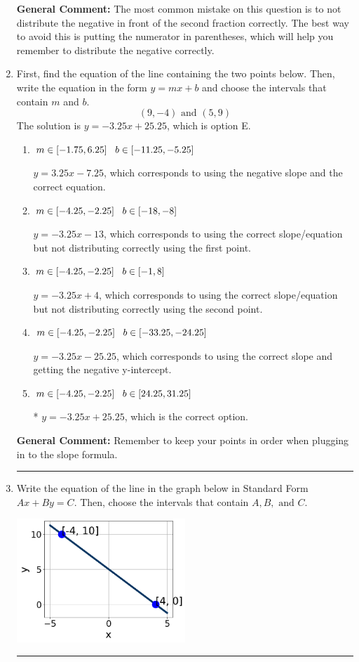 \documentclass{extbook}[14pt]
\newcommand{\litem}[1]{\item #1

\rule{\textwidth}{0.4pt}}
\begin{document}
\begin{enumerate}
{\textbf{General Comment:} The most common mistake on this question is to not distribute the negative in front of the second fraction correctly. The best way to avoid this is putting the numerator in parentheses, which will help you remember to distribute the negative correctly.
}
\litem{
First, find the equation of the line containing the two points below. Then, write the equation in the form $ y=mx+b $ and choose the intervals that contain $m$ and $b$.
\[ (9, -4) \text{ and } (5, 9) \]The solution is \( y = -3.25x + 25.25 \), which is option E.\begin{enumerate}[label=\Alph*.]
\item \( m \in [-1.75, 6.25] \hspace*{3mm} b \in [-11.25, -5.25] \)

 $y = 3.25x -7.25$, which corresponds to using the negative slope and the correct equation.
\item \( m \in [-4.25, -2.25] \hspace*{3mm} b \in [-18, -8] \)

 $y = -3.25x -13$, which corresponds to using the correct slope/equation but not distributing correctly using the first point.
\item \( m \in [-4.25, -2.25] \hspace*{3mm} b \in [-1, 8] \)

 $y = -3.25x + 4$, which corresponds to using the correct slope/equation but not distributing correctly using the second point.
\item \( m \in [-4.25, -2.25] \hspace*{3mm} b \in [-33.25, -24.25] \)

 $y = -3.25x -25.25$, which corresponds to using the correct slope and getting the negative y-intercept.
\item \( m \in [-4.25, -2.25] \hspace*{3mm} b \in [24.25, 31.25] \)

* $y = -3.25x + 25.25$, which is the correct option.
\end{enumerate}

\textbf{General Comment:} Remember to keep your points in order when plugging in to the slope formula.
}
\litem{
Write the equation of the line in the graph below in Standard Form $Ax+By=C$. Then, choose the intervals that contain $A, B, \text{ and } C$.

\begin{center}
    \includegraphics[width=0.5\textwidth]{../Figures/linearGraphToStandardCopyB.png}
\end{center}


}
\end{enumerate}
\end{document}
